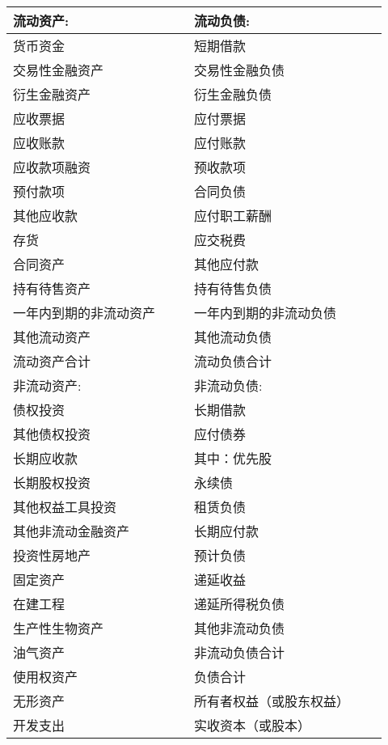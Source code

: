 \documentclass[a4paper,10pt]{ctexart}    %
\begin{document}
\begin{table}
\begin{tabular}[htbp]{p{4cm}|r|r|p{4.65cm}|r|r}
    流动资产: & & & 流动负债: & & \\\hline
    货币资金 & & & 短期借款 & & \\\hline
    交易性金融资产 & & & 交易性金融负债 & & \\\hline
    衍生金融资产 & & & 衍生金融负债 & & \\\hline
    应收票据 & & & 应付票据 & & \\\hline
    应收账款 & & & 应付账款 & & \\\hline
    应收款项融资 & & & 预收款项 & & \\\hline
    预付款项 & & & 合同负债 & & \\\hline
    其他应收款 & & & 应付职工薪酬 & & \\\hline
    存货 & & & 应交税费 & & \\\hline
    合同资产 & & & 其他应付款 & & \\\hline
    持有待售资产 & & & 持有待售负债 & & \\\hline
    一年内到期的非流动资产 & & & 一年内到期的非流动负债 & & \\\hline
    其他流动资产 & & & 其他流动负债 & & \\\hline
    流动资产合计 & & & 流动负债合计 & & \\\hline
    非流动资产: & & & 非流动负债: & & \\\hline
    债权投资 & & & 长期借款 & & \\\hline
    其他债权投资 & & & 应付债券 & & \\\hline
    长期应收款 & & & 其中：优先股 & & \\\hline
    长期股权投资 & & &\quad \qquad 永续债 & & \\\hline
    其他权益工具投资 & & & 租赁负债 & & \\\hline
    其他非流动金融资产 & & & 长期应付款 & & \\\hline
    投资性房地产 & & & 预计负债 & & \\\hline
    固定资产 & & & 递延收益 & & \\\hline
    在建工程 & & & 递延所得税负债 & & \\\hline
    生产性生物资产 & & & 其他非流动负债 & & \\\hline
    油气资产 & & & 非流动负债合计 & & \\\hline
    使用权资产 & & & 负债合计 & & \\\hline
    无形资产 & & & 所有者权益（或股东权益）& & \\\hline
    开发支出 & & & 实收资本（或股本）& & \\\hline

\end{tabular}
\end{table}
\end{document}
